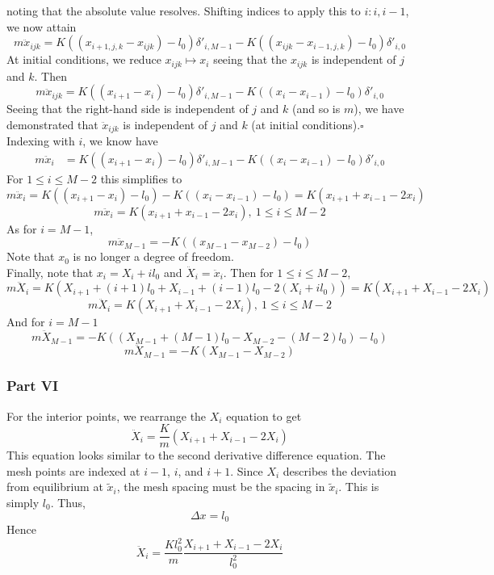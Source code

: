 \documentclass[letterpaper,12pt]{article}
\renewcommand*{\qed}{\hfill\ensuremath{\square}}
\begin{document}
\begin{flushleft}
    noting that the absolute value resolves. Shifting indices to apply this to $i:i,i-1$, we now attain
    $$m\ddot{x}_{ijk} = K\left((x_{i+1,j,k} - x_{ijk}) - l_0\right)\delta'_{i,M-1} - K\left((x_{ijk} - x_{i-1,j,k}) - l_0\right)\delta'_{i,0}$$
    At initial conditions, we reduce $x_{ijk} \mapsto x_i$ seeing that the $x_{ijk}$ is independent of $j$ and $k$. Then
    $$m\ddot{x}_{ijk} = K\left((x_{i+1} - x_{i}) - l_0\right)\delta'_{i,M-1} - K\left((x_{i} - x_{i-1}) - l_0\right)\delta'_{i,0}$$
    Seeing that the right-hand side is independent of $j$ and $k$ (and so is $m$), we have demonstrated that $\ddot{x}_{ijk}$ is independent of $j$ and $k$ (at initial conditions).\qed\\
    Indexing with $i$, we know have
    \begin{align*}
        m\ddot{x}_{i} &= K\left((x_{i+1} - x_{i}) - l_0\right)\delta'_{i,M-1} - K\left((x_{i} - x_{i-1}) - l_0\right)\delta'_{i,0}
    \end{align*}
    For $1 \leq i \leq M-2$ this simplifies to
    $$m\ddot{x}_i = K\left((x_{i+1} - x_{i}) - l_0\right) - K\left((x_{i} - x_{i-1}) - l_0\right) = K\left(x_{i+1} + x_{i-1} - 2x_i\right)$$
    $$\boxed{m\ddot{x}_i = K\left(x_{i+1} + x_{i-1} - 2x_i\right), \: 1 \leq i \leq M-2}$$
    As for $i = M-1$,
    $$\boxed{m\ddot{x}_{M-1} = -K\left((x_{M-1} - x_{M-2}) - l_0\right)}$$
    Note that $x_0$ is no longer a degree of freedom.\\
    Finally, note that $x_i = X_i + il_0$ and $\ddot{X}_i = \ddot{x}_i$. Then for $1 \leq i \leq M-2$,
    $$m\ddot{X}_i = K\left(X_{i+1} + (i+1)l_0 + X_{i-1} + (i-1)l_0 - 2\left(X_i + il_0\right)\right) = K\left(X_{i+1} + X_{i-1} - 2X_i\right)$$
    $$\boxed{m\ddot{X}_i = K\left(X_{i+1} + X_{i-1} - 2X_i\right), \: 1 \leq i \leq M-2}$$
    And for $i = M-1$
    $$m\ddot{X}_{M-1} = -K\left((X_{M-1} + (M-1)l_0 - X_{M-2} - (M-2)l_0) - l_0\right)$$
    $$\boxed{m\ddot{X}_{M-1} = -K\left(X_{M-1} - X_{M-2}\right)}$$

    \subsubsection*{Part VI}
    For the interior points, we rearrange the $X_i$ equation to get
    $$\ddot{X}_i = \frac{K}{m}\left(X_{i+1} + X_{i-1} - 2X_i\right)$$
    This equation looks similar to the second derivative difference equation. The mesh points are indexed at $i-1$, $i$, and $i+1$. Since $X_i$ describes the deviation from equilibrium at $\tilde{x}_i$, the mesh spacing must be the spacing in $\tilde{x}_i$. This is simply $l_0$. Thus,
    $$\boxed{\Delta x = l_0}$$
    Hence
    $$\boxed{\ddot{X}_i = \frac{Kl_0^2}{m}\frac{X_{i+1} + X_{i-1} - 2X_i}{l_0^2}}$$


\end{flushleft}
\end{document}
